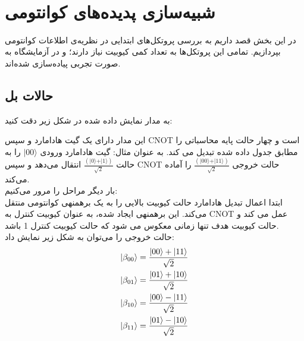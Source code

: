 \documentclass{book}
\begin{document}
\begin{tcolorbox}
	\begin{Verbatim}[commandchars=\\\{\}]
		
	\end{Verbatim}
\end{tcolorbox}





\chapter{شبیه‌سازی پدیده‌های کوانتومی}
در این بخش قصد داریم به بررسی پروتکل‌های ابتدایی در نظریه‌ی اطلاعات کوانتومی بپردازیم. تمامی این پروتکل‌ها به تعداد کمی کیوبیت نیاز دارند؛ و در آزمایشگاه به صورت تجربی پیاده‌سازی شده‌اند. 
\section{حالات بل}
به مدار نمایش داده شده در شکل زیر دقت کنید:

این مدار دارای یک گیت هادامارد و سپس CNOT است و چهار حالت پایه محاسباتی را مطابق جدول داده شده تبدیل می کند. به عنوان مثال:
 گیت هادامارد ورودی $\vert 00 \rangle$ را به حالت  $\frac{(\vert 0 \rangle + \vert 1 \rangle)}{\sqrt{2}}$ انتقال می‌دهد و سپس CNOT حالت خروجی $\frac{(\vert 00 \rangle + \vert 11 \rangle)}{\sqrt{2}}$ را آماده می‌کند.\\ 
 
 بار دیگر مراحل را مرور می‌کنیم:\\
  ابتدا اعمال تبدیل هادامارد حالت کیوبیت بالایی را به یک برهمنهی کوانتومی منتقل می‌کند. این برهمنهی ایجاد شده،‌ به عنوان کیوبیت کنترل به CNOT عمل می کند و حالت کیوبیت هدف تنها زمانی معکوس می شود که حالت کیوبیت کنترل 1 باشد.\\
  
  
حالت خروجی را می‌توان به شکل زیر نمایش داد:\\

\begin{equation}
	\begin{split}
		\ket{\beta_{00}} &= \frac{\ket{00} + \ket{11}}{\sqrt{2}} \\
		\ket{\beta_{01}} &= \frac{\ket{01} + \ket{10}}{\sqrt{2}} \\
		\ket{\beta_{10}} &= \frac{\ket{00} - \ket{11}}{\sqrt{2}} \\
		\ket{\beta_{11}} &= \frac{\ket{01} - \ket{10}}{\sqrt{2}}
	\end{split}	
\end{equation}
\end{document}
